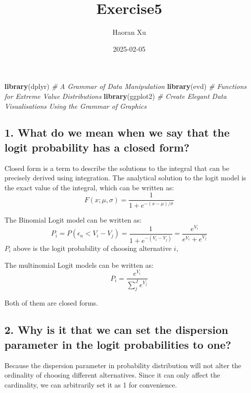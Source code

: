 \documentclass[
]{article}
\title{Exercise5}
\author{Haoran Xu}
\date{2025-02-05}
\newenvironment{Shaded}{\begin{snugshade}}{\end{snugshade}}
\newcommand{\CommentTok}[1]{\textcolor[rgb]{0.56,0.35,0.01}{\textit{#1}}}
\newcommand{\FunctionTok}[1]{\textcolor[rgb]{0.13,0.29,0.53}{\textbf{#1}}}
\newcommand{\NormalTok}[1]{#1}
\begin{document}
\maketitle

\begin{Shaded}
\begin{Highlighting}[]
\FunctionTok{library}\NormalTok{(dplyr) }\CommentTok{\# A Grammar of Data Manipulation}
\FunctionTok{library}\NormalTok{(evd) }\CommentTok{\# Functions for Extreme Value Distributions }
\FunctionTok{library}\NormalTok{(ggplot2) }\CommentTok{\# Create Elegant Data Visualisations Using the Grammar of Graphics}
\end{Highlighting}
\end{Shaded}

\subsection{1. What do we mean when we say that the logit probability
has a closed
form?}\label{what-do-we-mean-when-we-say-that-the-logit-probability-has-a-closed-form}

Closed form is a term to describe the solutions to the integral that can
be precisely derived using integration. The analytical solution to the
logit model is the exact value of the integral, which can be written as:
\[
F(x;\mu, \sigma) = \frac{1}{1 + e^{- (x - \mu) / \sigma}}
\]

The Binomial Logit model can be written as: \[
P_i = P(\epsilon_n < V_i - V_j) = \frac{1}{1 + e^{- (V_i - V_j)}} = \frac{e^{V_i}}{e^{V_i} + e^{V_j}}
\] \(P_i\) above is the logit probability of choosing alternative \(i\),

The multinomial Logit models can be written as: \[
P_i = \frac{e^{V_i}}{\sum_{j}^{J}e^{V_j}}
\]

Both of them are closed forms.

\subsection{2. Why is it that we can set the dispersion parameter in the
logit probabilities to
one?}\label{why-is-it-that-we-can-set-the-dispersion-parameter-in-the-logit-probabilities-to-one}

Because the dispersion parameter in probability distribution will not
alter the ordinality of choosing different alternatives. Since it can
only affect the cardinality, we can arbitrarily set it as 1 for
convenience.
\end{document}
